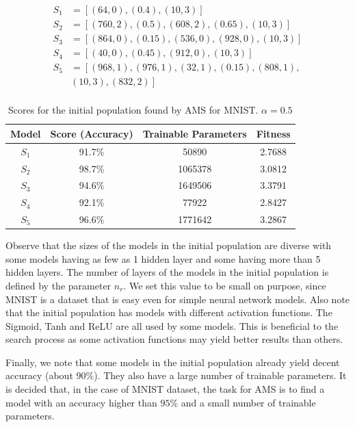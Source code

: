 \documentclass[preprint,12pt]{elsarticle}%
\begin{document}
\begin{align*}
S_1 & = \left[ (64, 0), (0.4), (10, 3) \right] \\
S_2 & = \left[ (760, 2), (0.5), (608, 2), (0.65), (10, 3) \right] \\
S_3 & = \left[ (864, 0), (0.15), (536, 0), (928, 0), (10, 3) \right] \\
S_4 & = \left[ (40,0), (0.45), (912, 0), (10, 3) \right] \\
S_5 & = \left[ (968, 1), (976, 1), (32, 1), (0.15), (808, 1), \right.\\
& \left. (10, 3), (832, 2) \right] \\
\end{align*}

\vspace{-2em}

\begin{table}[H]
\begin{center}
\begin{tabular}{| c | c | c | c |}
\hline
Model & Score (Accuracy) & Trainable Parameters & Fitness\\
\hline
$S_1$ & 91.7\% & 50890 & 2.7688\\
$S_2$ & 98.7\% & 1065378 & 3.0812\\
$S_3$ & 94.6\% & 1649506 & 3.3791\\
$S_4$ & 92.1\% & 77922 & 2.8427\\
$S_5$ & 96.6\% & 1771642 & 3.2867\\
\hline
\end{tabular}
\end{center}
\caption{Scores for the initial population found by AMS for MNIST. $\alpha = 0.5$}
\label{table:ams_mnist_initial}
\end{table} 

Observe that the sizes of the models in the initial population are diverse with some models having as few as 1 hidden layer and some having more than 5 hidden layers. The number of layers of the models in the initial population is defined by the parameter $n_r$. We set this value to be small on purpose, since MNIST is a dataset that is easy even for simple neural network models. Also note that the initial population has models with different activation functions. The Sigmoid, Tanh and ReLU are all used by some models. This is beneficial to the search process as some activation functions may yield better results than others.

Finally, we note that some models in the initial population already yield decent accuracy (about $90\%$). They also have a large number of trainable parameters. It is decided that, in the case of MNIST dataset, the task for AMS is to find a model with an accuracy higher than $95\%$ and a small number of trainable parameters.
\end{document}
